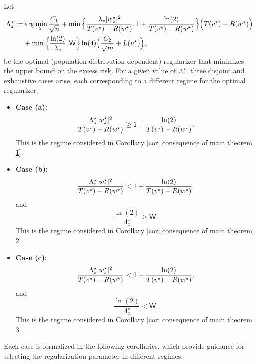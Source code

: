 Let
\begin{equation*}\label{eqn: Optimal Lambda}
    \begin{aligned}
            \Lambda_z^\star :=& \arg\min_{\lambda_z}        \frac{C_1}{\sqrt{n}} +
        \min\Big\{\frac{\lambda_z|w^\star_z|^2}{T(v^\star) - R(w^\star)}, 1+\frac{\ln(2)}{T(v^\star) - R(w^\star)}\Big\}\Big(T(v^\star) - R(w^\star)\Big) \\
        &+
        \min\Big\{\frac{\ln(2)}{\lambda_z},\mathsf{W}\Big\}\ln(4)\Big(\frac{C_2}{\sqrt{m}} + L(u^\star)\Big),
    \end{aligned}
\end{equation*}
be the optimal (population distribution dependent) regularizer that minimizes the upper bound on the excess risk.
For a given value of $\Lambda_z^\star$, three disjoint and exhaustive cases arise, each corresponding to a different regime for the optimal regularizer:
\begin{itemize}
    \item \textbf{Case (a):}
    \begin{equation*}
        \frac{\Lambda_z^\star|w^\star_z|^2}{T(v^\star) - R(w^\star)} \geq 1+\frac{\ln(2)}{T(v^\star) - R(w^\star)}.
    \end{equation*}
    This is the regime considered in Corollary \ref{cor: consequence of main theorem 1}.
    \item \textbf{Case (b):}     \begin{equation*}
        \frac{\Lambda_z^\star|w^\star_z|^2}{T(v^\star) - R(w^\star)} < 1+\frac{\ln(2)}{T(v^\star) - R(w^\star)}.
    \end{equation*} and
    \begin{equation*}
        \frac{\ln(2)}{\Lambda_z^\star} \geq \mathsf{W}.
    \end{equation*} This is the regime considered in Corollary \ref{cor: consequence of main theorem 2}.
    \item \textbf{Case (c):}
    \begin{equation*}
        \frac{\Lambda_z^\star|w^\star_z|^2}{T(v^\star) - R(w^\star)} < 1+\frac{\ln(2)}{T(v^\star) - R(w^\star)}.
    \end{equation*} and
    \begin{equation*}
        \frac{\ln(2)}{\Lambda_z^\star} < \mathsf{W}.
    \end{equation*}
    This is the regime considered in Corollary \ref{cor: consequence of main theorem 3}.
\end{itemize}

Each case is formalized in the following corollaries, which provide guidance for selecting the regularization parameter in different regimes.

